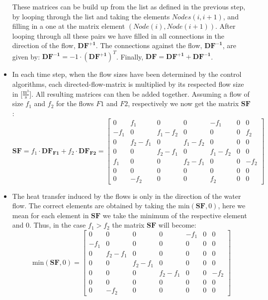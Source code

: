 \begin{itemize}
These matrices can be build up from the list as defined in the previous step, by looping through the list and taking the elements $Nodes(i,i+1)$, and filling in a one at the matrix element $(Node(i), Node(i+1))$. After looping through all these pairs we have filled in all connections in the direction of the flow, $\mathbf{DF^{+1}}$. The connections against the flow, $\mathbf{DF^{-1}}$, are given by: $\mathbf{DF^{-1}} = -1 \cdot (\mathbf{DF^{+1}})^T$. Finally, $\mathbf{DF} = \mathbf{DF^{+1}} + \mathbf{DF^{-1}}$. 
\item In each time step, when the flow sizes have been determined by the control algorithms, each directed-flow-matrix is multiplied by its respected flow size in [$\frac{\text{m}^3}{\text{s}}$]. All resulting matrices can then be added together. Assuming a flow of size $f_1$ and $f_2$ for the flows $F1$ and $F2$, respectively we now get the matrix $\mathbf{SF}$:
\begin{equation}
		\mathbf{SF} = f_1 \cdot \mathbf{DF_{F1}} + f_2 \cdot \mathbf{DF_{F2}} = \begin{bmatrix}
							0   & f_1    & 0       & 0       & -f_1    & 0 & 0 \\
							-f_1& 0      & f_1-f_2 & 0       & 0       & 0 & f_2 \\
							0   & f_2-f_1& 0       & f_1-f_2 & 0       & 0 & 0 \\
							0   & 0      & f_2-f_1 & 0       & f_1-f_2 & 0 & 0 \\
							f_1 & 0      & 0       & f_2-f_1 & 0       & 0 & -f_2 \\
							0   & 0      & 0       & 0       & 0       & 0 & 0 \\
							0   & -f_2   & 0       & 0       & f_2     & 0 & 0 
							\end{bmatrix}
	\label{eq:addflows}
	\end{equation}
\item The heat transfer induced by the flows is only in the direction of the water flow. The correct elements are obtained by taking the $\text{min}(\mathbf{SF},0)$, here we mean for each element in $\mathbf{SF}$ we take the minimum of the respective element and 0. Thus, in the case $f_1>f_2$ the matrix $\mathbf{SF}$ will become:
\begin{equation}
		\text{min}(\mathbf{SF},0) =  \begin{bmatrix}
							0   & 0      & 0       & 0       & -f_1    & 0 & 0 \\
							-f_1& 0      & 0		   & 0       & 0       & 0 & 0 \\
							0   & f_2-f_1& 0       & 0			 & 0       & 0 & 0 \\
							0   & 0      & f_2-f_1 & 0       & 0			 & 0 & 0 \\
							0	  & 0      & 0       & f_2-f_1 & 0       & 0 & -f_2 \\
							0   & 0      & 0       & 0       & 0       & 0 & 0 \\
							0   & -f_2   & 0       & 0       & 0       & 0 & 0 
							\end{bmatrix}
	\label{eq:minSFzero}
	\end{equation}




\end{itemize}

